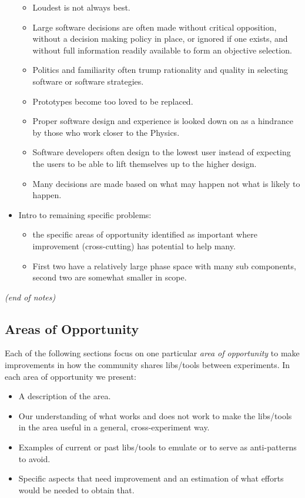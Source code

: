 \begin{itemize}
\begin{itemize}
\item Loudest is not always best.
\item Large software decisions are often made without critical opposition, without a decision making policy in place, or ignored if one exists, and without full information readily available to form an objective selection.
\item Politics and familiarity often trump rationality and quality in selecting software or software strategies.
\item Prototypes become too loved to be replaced.
\item Proper software design and experience is looked down on as a hindrance by those who work closer to the Physics.
\item Software developers often design to the lowest user instead of expecting the users to be able to lift themselves up to the higher design.
\item Many decisions are made based on what may happen not what is likely to happen.
  \end{itemize}

\item Intro to remaining specific problems:
\begin{itemize}
\item the specific areas of opportunity identified as important where improvement (cross-cutting) has potential to help many.
\item First two have a relatively large phase space with many sub components, second two are somewhat smaller in scope.
\end{itemize}

\end{itemize}
\textit{(end of notes)  }

\subsection{Areas of Opportunity}

Each of the following sections focus on one particular \textit{area of opportunity} to make improvements in how the community shares libs/tools between experiments.  In each area of opportunity we present:

\begin{itemize}
\item A description of the area.
\item Our understanding of what works and does not work to make the libs/tools in the area useful in a general, cross-experiment way.
\item Examples of current or past libs/tools to emulate or to serve as anti-patterns to avoid.
\item Specific aspects that need improvement and an estimation of what efforts would be needed to obtain that.
\end{itemize}
